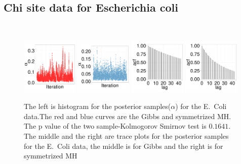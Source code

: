   \subsection{Chi site data for Escherichia coli}~
  \begin{figure}[H]
  \centering
  \begin{minipage}[!hp]{0.99\linewidth}
    \includegraphics [width=0.24\textwidth, angle=0]{figs/ecoli_ks/ecoli_alphatraceGBS_31_3_0_.pdf}
    \includegraphics [width=0.24\textwidth, angle=0]{figs/ecoli_ks/ecoli_alphatraceMH_31_3_0_.pdf}
    \includegraphics [width=0.24\textwidth, angle=0]{figs/ecoli_ks/ecoli_alphagbsacf_31_3_0_.pdf}
    \includegraphics [width=0.24\textwidth, angle=0]{figs/ecoli_ks/ecoli_alphamhacf_31_3_0_.pdf}
  \end{minipage}

    \caption{The left is histogram for the posterior samples($\alpha$) for the E.\ Coli data.The red and blue curves are the Gibbs and symmetrized MH. The p value of the two sample-Kolmogorov Smirnov test is $ 0.1641$. The middle and the right are trace plots for the posterior samples for the E.\ Coli data, the middle is for Gibbs and the right is for symmetrized MH}
     \label{fig:TRACE_ECOLI}
  \end{figure}
